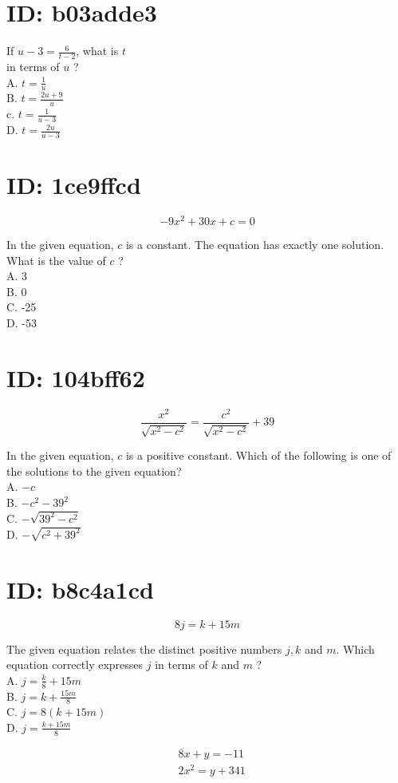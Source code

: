 \section*{ID: b03adde3}
If $u-3=\frac{6}{t-2}$, what is $t$\\
in terms of $u$ ?\\
A. $t=\frac{1}{u}$\\
B. $t=\frac{2 u+9}{u}$\\
c. $t=\frac{1}{u-3}$\\
D. $t=\frac{2 u}{u-3}$

\section*{ID: 1ce9ffcd}
$$
-9 x^{2}+30 x+c=0
$$

In the given equation, $c$ is a constant. The equation has exactly one solution. What is the value of $c$ ?\\
A. 3\\
B. 0\\
C. -25\\
D. -53

\section*{ID: 104bff62}
$$
\frac{x^{2}}{\sqrt{x^{2}-c^{2}}}=\frac{c^{2}}{\sqrt{x^{2}-c^{2}}}+39
$$

In the given equation, $c$ is a positive constant. Which of the following is one of the solutions to the given equation?\\
A. $-c$\\
B. $-c^{2}-39^{2}$\\
C. $-\sqrt{39^{2}-c^{2}}$\\
D. $-\sqrt{c^{2}+39^{2}}$

\section*{ID: b8c4a1cd}
$$
8 j=k+15 m
$$

The given equation relates the distinct positive numbers $j, k$ and $m$. Which equation correctly expresses $j$ in terms of $k$ and $m$ ?\\
A. $j=\frac{k}{8}+15 m$\\
B. $j=k+\frac{15 m}{8}$\\
C. $j=8(k+15 m)$\\
D. $j=\frac{k+15 m}{8}$

$$
\begin{aligned}
& 8 x+y=-11 \\
& 2 x^{2}=y+341
\end{aligned}
$$

